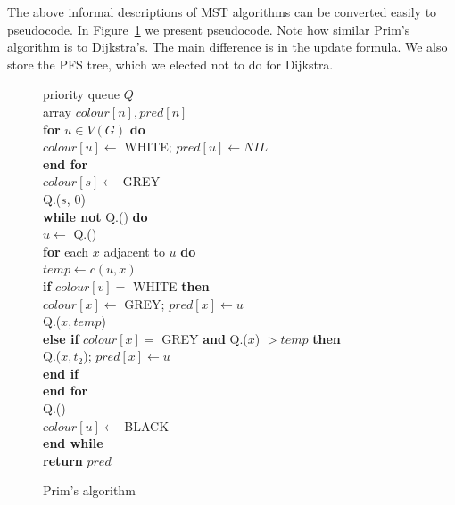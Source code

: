 The above informal descriptions of MST algorithms can be converted
easily to pseudocode. In Figure~\ref{fig:primcode} we present pseudocode. Note  how similar Prim's algorithm is to Dijkstra's. The main difference is
in the update formula. We also store the PFS tree, which we elected not to do for Dijkstra.

\begin{figure}


{
priority queue $Q$ \\

array $colour[n], pred[n]$ \\

\textbf{for} $u\in V(G)$ \textbf{do} \\

\> $colour[u] \gets$ WHITE; $pred[u] \gets NIL$  \\

\textbf{end for} \\

$colour[s] \gets $ GREY \\

Q.($s$, $0$) \\

\textbf{while not} Q.() \textbf{do} \\

\> $u \gets $ Q.() \\

\> \textbf{for} each $x$ adjacent to $u$ \textbf{do} \\

\> \> $temp \gets c(u, x)$ \\

\> \>  \textbf{if} $colour[v] = $ WHITE \textbf{then} \\

\> \> \> $colour[x] \gets $ GREY; $pred[x] \gets u$ \\

\> \> \> Q.($x, temp$) \\

\> \> \textbf{else if} $colour[x] = $ GREY \textbf{and} Q.($x$) $ > temp$ \textbf{then} \\

\> \> \> Q.($x, t_2$); $pred[x] \gets u$ \\

\> \> \textbf{end if} \\

\> \textbf{end for} \\

\> Q.() \\

\> $colour[u] \gets $ BLACK \\

\textbf{end while} \\

\textbf{return} $pred$ \\
}
\caption{Prim's algorithm}
\label{fig:primcode}
\end{figure}



